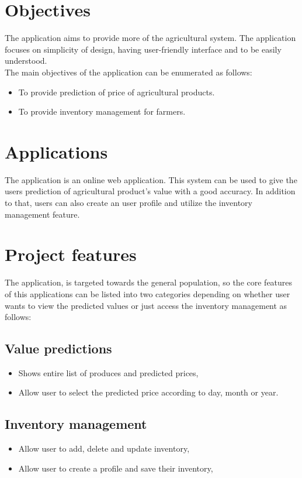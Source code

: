 \section{Objectives}
The application aims to provide more  of the agricultural system. The application focuses on 
simplicity of design, having user-friendly interface and to be easily understood. \\
The main objectives of the application can be enumerated as follows:
\vspace{-18pt}
\begin{itemize}
	\item To provide prediction of price of agricultural products.
	\item To provide inventory management for farmers.
\end{itemize}

\section{Applications}
The application is an online web application. This system can be used to give the users prediction of agricultural product’s value with a good accuracy. In addition to that, users
 can also create an user profile and utilize the inventory management feature.
 \section{Project features}
 The application, is targeted towards the general population, so the core features of this applications can be listed into two categories depending on whether user wants to view 
 the predicted values or just access the inventory management as follows: 

 \subsection{Value predictions}
 \vspace{-18pt}
 \begin{itemize}
	\item Shows entire list of produces and predicted prices, 
	\item Allow user to select the predicted price according to day, month or year.
\end{itemize}

\subsection{Inventory management}
 \vspace{-18pt}
 \begin{itemize}
	\item Allow user to add, delete and update inventory,  
	\item Allow user to create a profile and save their inventory,
\end{itemize}

